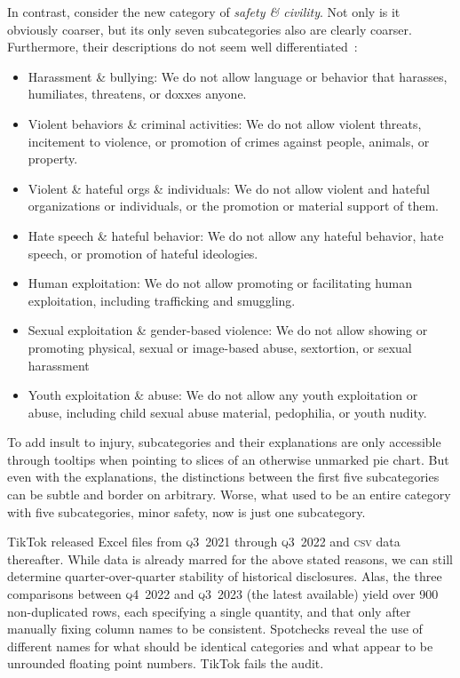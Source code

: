 \documentclass[nonacm,screen]{acmart}
\newcommand\V[1]{\textsc{\MakeLowercase{#1}}}
\begin{document}
In contrast, consider the new category of \emph{safety \& civility}. Not only is
it obviously coarser, but its only seven subcategories also are clearly coarser.
Furthermore, their descriptions do not seem well
differentiated~\cite{TikTok2023}:
\begin{itemize}
    \item Harassment \& bullying: We do not allow language or behavior that
    harasses, humiliates, threatens, or doxxes anyone.
    \item Violent behaviors \& criminal activities: We do not allow violent
    threats, incitement to violence, or promotion of crimes against people,
    animals, or property.
    \item Violent \& hateful orgs \& individuals: We do not allow violent and
    hateful organizations or individuals, or the promotion or material support
    of them.
    \item Hate speech \& hateful behavior: We do not allow any hateful behavior,
    hate speech, or promotion of hateful ideologies.
    \item Human exploitation: We do not allow promoting or facilitating human
    exploitation, including trafficking and smuggling.
    \item Sexual exploitation \& gender-based violence: We do not allow showing
    or promoting physical, sexual or image-based abuse, sextortion, or sexual
    harassment
    \item Youth exploitation \& abuse: We do not allow any youth exploitation or
    abuse, including child sexual abuse material, pedophilia, or youth nudity.
\end{itemize}
To add insult to injury, subcategories and their explanations are only
accessible through tooltips when pointing to slices of an otherwise unmarked pie
chart. But even with the explanations, the distinctions between the first five
subcategories can be subtle and border on arbitrary. Worse, what used to be an
entire category with five subcategories, minor safety, now is just one
subcategory.

TikTok released Excel files from \V{Q3}~2021 through \V{Q3}~2022 and \V{CSV}
data thereafter. While data is already marred for the above stated reasons, we
can still determine quarter-over-quarter stability of historical disclosures.
Alas, the three comparisons between \V{Q4}~2022 and \V{Q3}~2023 (the latest
available) yield over 900 non-duplicated rows, each specifying a single
quantity, and that only after manually fixing column names to be consistent.
Spotchecks reveal the use of different names for what should be identical
categories and what appear to be unrounded floating point numbers. TikTok fails
the audit.
\end{document}
